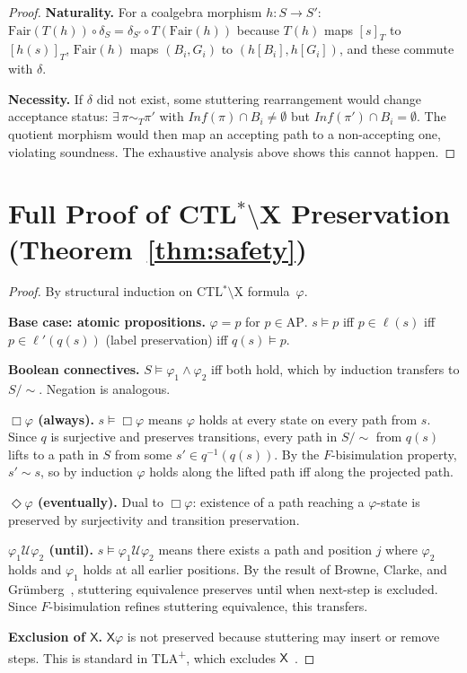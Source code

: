 \documentclass[11pt]{article}
\newcommand{\Fair}{\ensuremath{\mathrm{Fair}}}
\newcommand{\AP}{\ensuremath{\mathrm{AP}}}
\newcommand{\TLAplus}{TLA\textsuperscript{+}}
\begin{document}
\begin{proof}
\textbf{Naturality.}
For a coalgebra morphism $h : S \to S'$:
$\Fair(T(h)) \circ \delta_S = \delta_{S'} \circ T(\Fair(h))$
because $T(h)$ maps $[s]_T$ to $[h(s)]_T$, $\Fair(h)$ maps $(B_i, G_i)$
to $(h[B_i], h[G_i])$, and these commute with $\delta$.

\textbf{Necessity.}
If $\delta$ did not exist, some stuttering rearrangement would change
acceptance status: $\exists\, \pi \sim_T \pi'$ with
$\mathit{Inf}(\pi) \cap B_i \neq \emptyset$ but
$\mathit{Inf}(\pi') \cap B_i = \emptyset$.
The quotient morphism would then map an accepting path to a non-accepting
one, violating soundness.
The exhaustive analysis above shows this cannot happen.
\end{proof}


\section{Full Proof of CTL$^*$$\setminus$X Preservation (Theorem~\ref{thm:safety})}
\label{app:safety-proof}

\begin{proof}
By structural induction on CTL$^*$$\setminus$X formula~$\varphi$.

\textbf{Base case: atomic propositions.}
$\varphi = p$ for $p \in \AP$.
$s \models p$ iff $p \in \ell(s)$ iff $p \in \ell'(q(s))$ (label
preservation) iff $q(s) \models p$.

\textbf{Boolean connectives.}
$S \models \varphi_1 \wedge \varphi_2$ iff both hold, which by induction
transfers to $S/{\sim}$.
Negation is analogous.

\textbf{$\Box\varphi$ (always).}
$s \models \Box\varphi$ means $\varphi$ holds at every state on every path
from $s$.
Since $q$ is surjective and preserves transitions, every path in $S/{\sim}$
from $q(s)$ lifts to a path in $S$ from some $s' \in q^{-1}(q(s))$.
By the $F$-bisimulation property, $s' \sim s$, so by induction $\varphi$
holds along the lifted path iff along the projected path.

\textbf{$\Diamond\varphi$ (eventually).}
Dual to $\Box\varphi$: existence of a path reaching a $\varphi$-state is
preserved by surjectivity and transition preservation.

\textbf{$\varphi_1 \mathbin{\mathcal{U}} \varphi_2$ (until).}
$s \models \varphi_1 \mathbin{\mathcal{U}} \varphi_2$ means there exists a
path and position $j$ where $\varphi_2$ holds and $\varphi_1$ holds at all
earlier positions.
By the result of Browne, Clarke, and Gr\"umberg~\cite{BrowneCG88},
stuttering equivalence preserves until when next-step is excluded.
Since $F$-bisimulation refines stuttering equivalence, this transfers.

\textbf{Exclusion of $\mathsf{X}$.}
$\mathsf{X}\varphi$ is not preserved because stuttering may insert or
remove steps.
This is standard in \TLAplus{}, which excludes $\mathsf{X}$~\cite{Lamport94}.
\end{proof}
\end{document}
